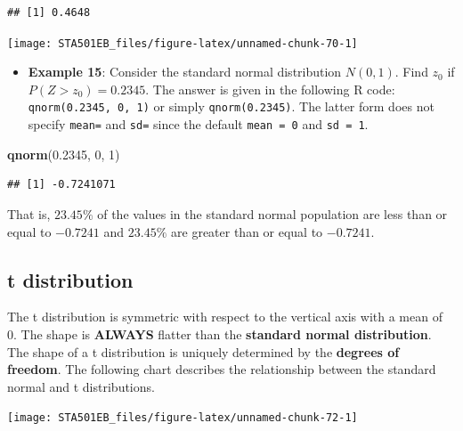 \documentclass[
]{book}
\newenvironment{Shaded}{\begin{snugshade}}{\end{snugshade}}
\newcommand{\DecValTok}[1]{\textcolor[rgb]{0.00,0.00,0.81}{#1}}
\newcommand{\FloatTok}[1]{\textcolor[rgb]{0.00,0.00,0.81}{#1}}
\newcommand{\FunctionTok}[1]{\textcolor[rgb]{0.13,0.29,0.53}{\textbf{#1}}}
\newcommand{\NormalTok}[1]{#1}
\providecommand{\tightlist}{%
  \setlength{\itemsep}{0pt}\setlength{\parskip}{0pt}}
\begin{document}
\begin{verbatim}
## [1] 0.4648
\end{verbatim}

\begin{center}\texttt{[image: STA501EB\_files/figure-latex/unnamed-chunk-70-1]} \end{center}

\begin{itemize}
\tightlist
\item
  \textbf{Example 15}: Consider the standard normal distribution \(N(0,1)\). Find \(z_0\) if \(P(Z > z_0) = 0.2345\). The answer is given in the following R code: \texttt{qnorm(0.2345,\ 0,\ 1)} or simply \texttt{qnorm(0.2345)}. The latter form does not specify \texttt{mean=} and \texttt{sd=} since the default \texttt{mean\ =\ 0} and \texttt{sd\ =\ 1}.
\end{itemize}

\begin{Shaded}
\begin{Highlighting}[]
\FunctionTok{qnorm}\NormalTok{(}\FloatTok{0.2345}\NormalTok{, }\DecValTok{0}\NormalTok{, }\DecValTok{1}\NormalTok{)     }
\end{Highlighting}
\end{Shaded}

\begin{verbatim}
## [1] -0.7241071
\end{verbatim}

That is, \(23.45\%\) of the values in the standard normal population are less than or equal to \(-0.7241\) and \(23.45\%\) are greater than or equal to \(-0.7241\).

\hypertarget{t-distribution}{%
\subsection{t distribution}\label{t-distribution}}

The t distribution is symmetric with respect to the vertical axis with a mean of 0. The shape is \textbf{ALWAYS} flatter than the \textbf{standard normal distribution}. The shape of a t distribution is uniquely determined by the \textbf{degrees of freedom}. The following chart describes the relationship between the standard normal and t distributions.

\begin{center}\texttt{[image: STA501EB\_files/figure-latex/unnamed-chunk-72-1]} \end{center}
\end{document}

